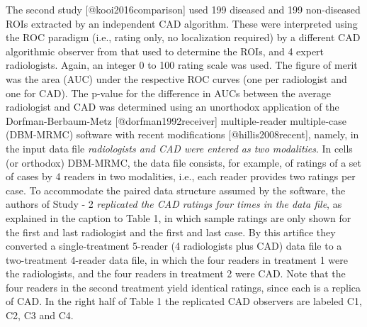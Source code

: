 \documentclass[
]{article}
\begin{document}
The second study {[}@kooi2016comparison{]} used 199 diseased and 199 non-diseased ROIs extracted by an independent CAD algorithm. These were interpreted using the ROC paradigm (i.e., rating only, no localization required) by a different CAD algorithmic observer from that used to determine the ROIs, and 4 expert radiologists. Again, an integer 0 to 100 rating scale was used. The figure of merit was the area (AUC) under the respective ROC curves (one per radiologist and one for CAD). The p-value for the difference in AUCs between the average radiologist and CAD was determined using an unorthodox application of the Dorfman-Berbaum-Metz {[}@dorfman1992receiver{]} multiple-reader multiple-case (DBM-MRMC) software with recent modifications {[}@hillis2008recent{]}, namely, in the input data file \emph{radiologists and CAD were entered as two modalities}. In cells (or orthodox) DBM-MRMC, the data file consists, for example, of ratings of a set of cases by 4 readers in two modalities, i.e., each reader provides two ratings per case. To accommodate the paired data structure assumed by the software, the authors of Study - 2 \emph{replicated the CAD ratings four times in the data file}, as explained in the caption to Table 1, in which sample ratings are only shown for the first and last radiologist and the first and last case. By this artifice they converted a single-treatment 5-reader (4 radiologists plus CAD) data file to a two-treatment 4-reader data file, in which the four readers in treatment 1 were the radiologists, and the four readers in treatment 2 were CAD. Note that the four readers in the second treatment yield identical ratings, since each is a replica of CAD. In the right half of Table 1 the replicated CAD observers are labeled C1, C2, C3 and C4.
\end{document}
